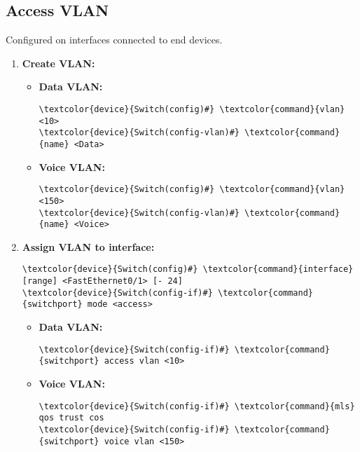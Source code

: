 \documentclass[10pt, a4paper, onecolumn, oneside, titlepage, openany]{book}
\begin{document}
\subsection{Access VLAN}
Configured on interfaces connected to end devices.
\begin{enumerate}
    \item \textbf{Create VLAN:}
    \begin{itemize}
        \item \textbf{Data VLAN:}
\begin{Verbatim}[commandchars=\\\{\}]
\textcolor{device}{Switch(config)#} \textcolor{command}{vlan} <10>
\textcolor{device}{Switch(config-vlan)#} \textcolor{command}{name} <Data>
\end{Verbatim}
        \item \textbf{Voice VLAN:}
\begin{Verbatim}[commandchars=\\\{\}]
\textcolor{device}{Switch(config)#} \textcolor{command}{vlan} <150>
\textcolor{device}{Switch(config-vlan)#} \textcolor{command}{name} <Voice>
\end{Verbatim}
    \end{itemize}
    \item \textbf{Assign VLAN to interface:}
\begin{Verbatim}[commandchars=\\\{\}]
\textcolor{device}{Switch(config)#} \textcolor{command}{interface} [range] <FastEthernet0/1> [- 24]
\textcolor{device}{Switch(config-if)#} \textcolor{command}{switchport} mode <access>
\end{Verbatim}
    \begin{itemize}
        \item \textbf{Data VLAN:}
\begin{Verbatim}[commandchars=\\\{\}]
\textcolor{device}{Switch(config-if)#} \textcolor{command}{switchport} access vlan <10>
\end{Verbatim}
        \item \textbf{Voice VLAN:}
\begin{Verbatim}[commandchars=\\\{\}]
\textcolor{device}{Switch(config-if)#} \textcolor{command}{mls} qos trust cos
\textcolor{device}{Switch(config-if)#} \textcolor{command}{switchport} voice vlan <150>
\end{Verbatim}
    \end{itemize}
\end{enumerate}
\end{document}
